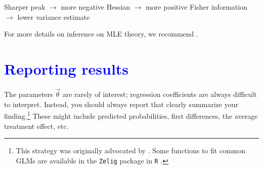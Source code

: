 \documentclass[11pt]{article}
\newcommand{\bblue}[1]{\textbf{\textcolor{blue}{#1}}}
\newcommand{\bgreen}[1]{\textbf{\color{olive}{#1}}}
\begin{document}
\bgreen{Remember:} Sharper peak $\rightarrow$ more negative Hessian $\rightarrow$ more positive Fisher information $\rightarrow$ lower variance estimate

For more details on inference on MLE theory, we recommend \citet{casella2002}.

\section*{\bblue{Reporting results}}

The parameters $\vec\theta$ are rarely of interest; regression coefficients are always difficult to interpret. Instead, you should always report \bgreen{quantities of interest} that clearly summarize your finding.\footnote{This strategy was originally advocated by \citet{king2000}. Some functions to fit common GLMs are available in the \texttt{Zelig} package in \texttt{R} \citep{imai2008,choirat2017}.} These might include predicted probabilities, first differences, the average treatment effect, etc.
\end{document}
